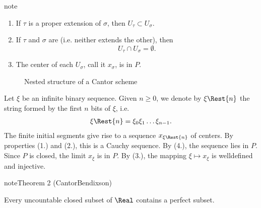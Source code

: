 \documentclass[letterpaper,10pt,english]{jupyterBook}
\let\sphinxpxdimen\pdfpxdimen\else\newdimen\sphinxpxdimen
\begin{document}
\begin{sphinxadmonition}{note}
\begin{enumerate}
\item {} 
\sphinxAtStartPar
If \(\tau\) is a proper extension of \(\sigma\), then \(U_\tau \subset U_\sigma\).

\item {} 
\sphinxAtStartPar
If \(\tau\) and \(\sigma\) are  (i.e. neither extends the other), then
\begin{equation*}
        U_\tau \cap U_\sigma = \emptyset.
    \end{equation*}
\item {} 
\sphinxAtStartPar
The center of each \(U_\sigma\), call it \(x_\sigma\), is in \(P\).

\end{enumerate}

\begin{figure}[H]
\centering
\capstart

\noindent\sphinxincludegraphics[height=400\sphinxpxdimen]{{Cantor_Scheme}.png}
\caption{Nested structure of a Cantor scheme}\label{\detokenize{perfect_subsets_R:cantor-scheme}}\end{figure}

\sphinxAtStartPar
Let \(\xi\) be an infinite binary sequence. Given \(n \geq 0\), we denote by \(\xi\Rest{n}\) the string formed by the first \(n\) bits of \(\xi\), i.e.
\begin{equation*}
\begin{split}
\xi\Rest{n} = \xi_0 \xi_1 \dots \xi_{n-1}.
\end{split}
\end{equation*}
\sphinxAtStartPar
The finite initial segments give rise to a sequence \(x_{\xi\Rest{n}}\) of centers. By properties (1.) and (2.), this is a Cauchy sequence. By (4.), the sequence lies in \(P\). Since \(P\) is closed, the limit \(x_\xi\) is in \(P\). By (3.), the mapping \(\xi \mapsto x_\xi\) is well\sphinxhyphen{}defined and injective.
\end{sphinxadmonition}
\label{perfect_subsets_R:cantor-bendixson}
\begin{sphinxadmonition}{note}{Theorem 2 (Cantor\sphinxhyphen{}Bendixson)}



\sphinxAtStartPar
Every uncountable closed subset of \(\Real\) contains a perfect subset.
\end{sphinxadmonition}
\end{document}
